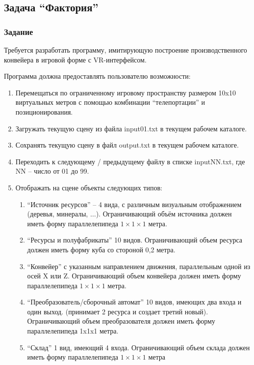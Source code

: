 \subsection*{Задача “Фактория”}

\subsubsection*{Задание}

Требуется разработать программу, имитирующую построение производственного конвейера в игровой форме с VR-интерфейсом.

Программа должна предоставлять пользователю возможности:
\begin{enumerate}
    \item Перемещаться по ограниченному игровому пространству размером 10x10 виртуальных метров с помощью комбинации “телепортации” и позиционирования.
    \item Загружать текущую сцену из файла input01.txt в текущем рабочем каталоге.
    \item Сохранять текущую сцену в файл output.txt в текущем рабочем каталоге.
    \item Переходить к следующему / предыдущему файлу в списке inputNN.txt, где NN -- число от 01 до 99.
    \item Отображать на сцене объекты следующих типов:
    \begin{enumerate}
        \item “Источник ресурсов” -- 4 вида, с различным визуальным отображением (деревья, минералы, $\dots$). Ограничивающий объём источника должен иметь форму параллелепипеда $1\times 1\times 1$ метра. 
        \item “Ресурсы и полуфабрикаты” 10 видов. Ограничивающий объем ресурса должен иметь форму куба со стороной 0,2 метра.
        \item “Конвейер” с указанным направлением движения, параллельным одной из осей X или Z. Ограничивающий объем конвейера должен иметь форму параллелепипеда $1\times 1\times 1$ метра.
        \item “Преобразователь/сборочный автомат” 10 видов, имеющих два входа и один выход. (принимает 2 ресурса и создает третий новый). Ограничивающий объем преобразователя должен иметь форму параллелепипеда 1x1x1 метра.
        \item “Склад” 1 вид, имеющий 4 входа. Ограничивающий объем склада должен иметь форму параллелепипеда $1\times 1\times 1$ метра    
    \end{enumerate}

\end{enumerate}
